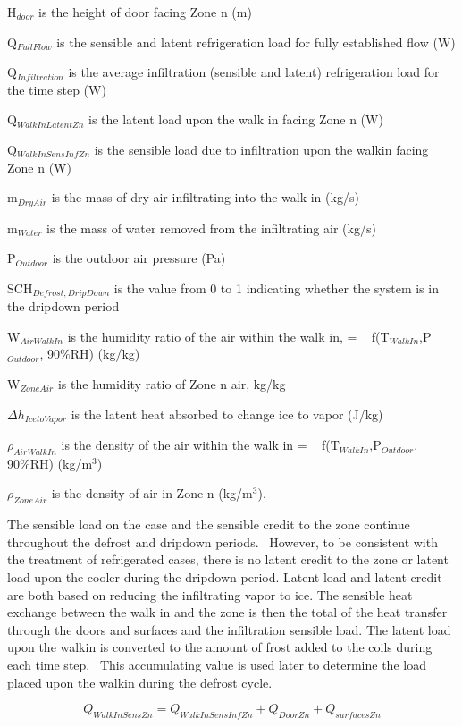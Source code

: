 H\(_{door}\) is the height of door facing Zone n (m)

Q\(_{FullFlow}\) is the sensible and latent refrigeration load for fully established flow (W)

Q\(_{Infiltration}\) is the average infiltration (sensible and latent) refrigeration load for the time step (W)

Q\(_{WalkInLatentZn}\) is the latent load upon the walk in facing Zone n (W)

Q\(_{WalkInSensInfZn}\) is the sensible load due to infiltration upon the walkin facing Zone n (W)

m\(_{DryAir}\) is the mass of dry air infiltrating into the walk-in (kg/s)

m\(_{Water}\) is the mass of water removed from the infiltrating air (kg/s)

P\(_{Outdoor}\) is the outdoor air pressure (Pa)

SCH\(_{Defrost,DripDown}\) is the value from 0 to 1 indicating whether the system is in the dripdown period

W\(_{AirWalkIn}\) is the humidity ratio of the air within the walk in, = ~ f(T\(_{WalkIn}\),P\(_{Outdoor}\), 90\%RH) (kg/kg)

W\(_{ZoneAir}\) is the humidity ratio of Zone n air, kg/kg

\(\Delta h_{IcetoVapor}\) is the latent heat absorbed to change ice to vapor (J/kg)

\(\rho_{AirWalkIn}\) is the density of the air within the walk in = ~ f(T\(_{WalkIn}\),P\(_{Outdoor}\), 90\%RH) (kg/m\(^{3}\))

\(\rho_{ZoneAir}\) is the density of air in Zone n (kg/m\(^{3}\)).

The sensible load on the case and the sensible credit to the zone continue throughout the defrost and dripdown periods.~ However, to be consistent with the treatment of refrigerated cases, there is no latent credit to the zone or latent load upon the cooler during the dripdown period. Latent load and latent credit are both based on reducing the infiltrating vapor to ice. The sensible heat exchange between the walk in and the zone is then the total of the heat transfer through the doors and surfaces and the infiltration sensible load. The latent load upon the walkin is converted to the amount of frost added to the coils during each time step.~ This accumulating value is used later to determine the load placed upon the walkin during the defrost cycle.

\begin{equation}
Q_{WalkInSensZn} = Q_{WalkInSensInfZn} + Q_{DoorZn} + Q_{surfacesZn}
\end{equation}

